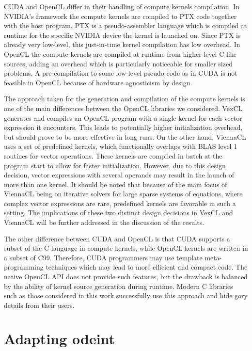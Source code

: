 \documentclass[final]{siamltex}
\newcommand{\addpp}[1]{{#1\nolinebreak[4]\hspace{-.05em}\raisebox{.4ex}{\tiny\bf ++}}\xspace}
\newcommand{\Cpp}{\addpp{C}}
\begin{document}
CUDA and OpenCL differ in their handling of compute kernels compilation. In
NVIDIA's framework the compute kernels are compiled to PTX code together with
the host program. PTX is a pseudo-assembler language which is compiled at
runtime for the specific NVIDIA device the kernel is launched on. Since PTX is
already very low-level, this just-in-time kernel compilation has low overhead.
In OpenCL the compute kernels are compiled at runtime from higher-level C-like
sources, adding an overhead which is particularly noticeable for smaller
sized problems. A pre-compilation to some low-level pseudo-code as in CUDA is
not feasible in OpenCL because of hardware agnosticism by design.

The approach taken for the generation and compilation of the compute kernels is
one of the main differences between the OpenCL libraries we considered.
VexCL generates and compiles an OpenCL
program with a single kernel for each vector expression it encounters.  This
leads to potentially higher initialization overhead, but should prove to be
more effective in long runs. On the other hand,
ViennaCL uses a set of predefined kernels, which functionally overlaps with
BLAS level 1 routines for vector operations. These kernels are compiled in
batch at the program start to allow for faster initialization. However, due to
this design decision, vector expressions with several operands may result in the launch
of more than one kernel. It should be noted that because of the main focus
of ViennaCL being on iterative solvers for large sparse systems of equations,
where complex vector expressions are rare, predefined kernels are favorable in
such a setting.  The implications of these two distinct design decisions in
VexCL and ViennaCL will be further addressed in the discussion of the results.

The other difference between CUDA and OpenCL is that CUDA supports a subset of
the \Cpp language in compute kernels, while OpenCL kernels are written in a subset
of C99. Therefore, CUDA programmers may use template meta-programming techniques
which may lead to more efficient and compact code. The native OpenCL API does
not provide such features, but the drawback is balanced by the ability of
kernel source generation during runtime. Modern \Cpp libraries such as those
considered in this work successfully use this approach and hide gory details
from their users.




%
%
\section{Adapting odeint} \label{sec:adapting-odeint}
\end{document}
